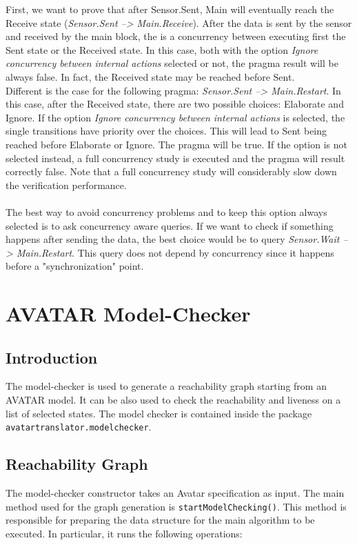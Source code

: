 \documentclass[12pt]{article}
\begin{document}
First, we want to prove that after Sensor.Sent, Main will eventually reach the Receive state (\textit{Sensor.Sent --> Main.Receive}). After the data is sent by the sensor and received by the main block, the is a concurrency between executing first the Sent state or the Received state. In this case, both with the option \textit{Ignore concurrency between internal actions} selected or not, the pragma result will be always false. In fact, the Received state may be reached before Sent.\\
Different is the case for the following pragma: \textit{Sensor.Sent --> Main.Restart}. In this case, after the Received state, there are two possible choices: Elaborate and Ignore. If the option \textit{Ignore concurrency between internal actions} is selected, the single transitions have priority over the choices. This will lead to Sent being reached before Elaborate or Ignore. The pragma will be true. If the option is not selected instead, a full concurrency study is executed and the pragma will result correctly false. Note that a full concurrency study will considerably slow down the verification performance.
\\\\
The best way to avoid concurrency problems and to keep this option always selected is to ask concurrency aware queries. If we want to check if something happens after sending the data, the best choice would be to query \textit{Sensor.Wait --> Main.Restart}. This query does not depend by concurrency since it happens before a "synchronization" point.

\newpage
\section{AVATAR Model-Checker}
\label{sec:am}

\subsection{Introduction}
The model-checker is used to generate a reachability graph starting from an AVATAR model. It can be also used to check the reachability and liveness on a list of selected states. The model checker is contained inside the package \texttt{avatartranslator.modelchecker}.




\subsection{Reachability Graph}
The model-checker constructor takes an Avatar specification as input. The main method used for the graph generation is \texttt{startModelChecking()}. This method is responsible for preparing the data structure for the main algorithm to be executed. In particular, it runs the following operations:
\end{document}
